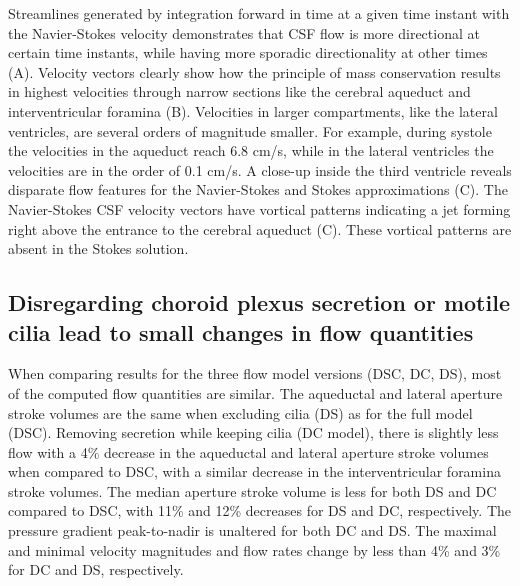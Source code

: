 \documentclass{template}
\begin{document}
Streamlines generated by integration forward in time at a given time
instant with the Navier-Stokes velocity demonstrates that CSF flow is more directional at certain time
instants, while having more sporadic directionality at other times (A).
Velocity vectors clearly show how the principle of mass conservation results in highest velocities
through narrow sections like the cerebral aqueduct and interventricular foramina
(B).
Velocities in larger compartments, like the lateral ventricles, are several orders 
of magnitude smaller. For example, during systole the velocities in the aqueduct
reach 6.8 cm/s, while in the lateral ventricles the velocities are in the order of
0.1 cm/s. A close-up inside the third ventricle reveals disparate flow features for 
the Navier-Stokes and Stokes approximations (C).
The Navier-Stokes CSF velocity vectors have vortical patterns
indicating a jet forming right above the entrance to
the cerebral aqueduct (C).
These vortical patterns are absent in the Stokes solution.

\subsection{Disregarding choroid plexus secretion or motile cilia lead to small changes in flow quantities}
When comparing results for the three flow model versions (DSC, DC, DS), most of the computed flow quantities are similar.
The aqueductal and lateral aperture stroke volumes are the same when excluding cilia (DS) as for the full model (DSC).
Removing secretion while keeping cilia (DC model), there is slightly less flow with a 4\% decrease in the aqueductal
and lateral aperture stroke volumes when compared to DSC, with a similar decrease in the interventricular foramina stroke volumes.
The median aperture stroke volume is less for both DS and DC compared to DSC, with 11\% and 12\% decreases for DS and DC,
respectively. The pressure gradient peak-to-nadir is unaltered for both DC and DS.
The maximal and minimal velocity magnitudes and flow rates change
by less than 4\% and 3\% for DC and DS, respectively.
\end{document}
